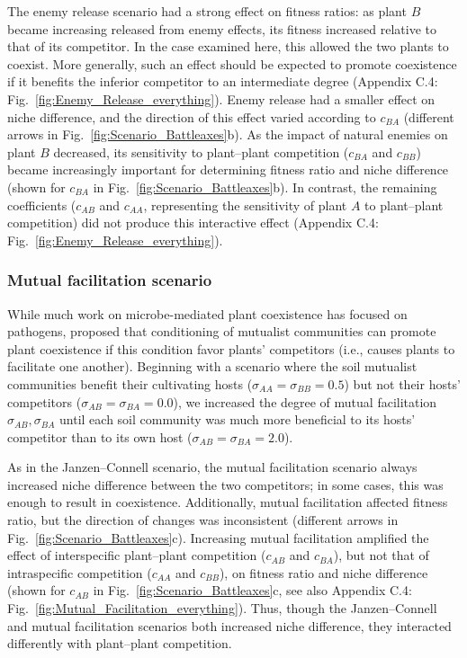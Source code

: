 The enemy release scenario had a strong effect on fitness ratios: as plant $B$ became increasing released from enemy effects, its fitness increased relative to that of its competitor. In the case examined here, this allowed the two plants to coexist. More generally, such an effect should be expected to promote coexistence if it benefits the inferior competitor to an intermediate degree (Appendix C.4: Fig.~\ref{fig:Enemy_Release_everything}). Enemy release had a smaller effect on niche difference, and the direction of this effect varied according to $c_{BA}$ (different arrows in Fig.~\ref{fig:Scenario_Battleaxes}b). As the impact of natural enemies on plant $B$ decreased, its sensitivity to plant--plant competition ($c_{BA}$ and $c_{BB}$) became increasingly important for determining fitness ratio and niche difference (shown for $c_{BA}$ in Fig.~\ref{fig:Scenario_Battleaxes}b). In contrast, the remaining coefficients ($c_{AB}$ and $c_{AA}$, representing the sensitivity of plant $A$ to plant--plant competition) did not produce this interactive effect (Appendix C.4: Fig.~\ref{fig:Enemy_Release_everything}).
\par



\subsubsection*{Mutual facilitation scenario}
While much work on microbe-mediated plant coexistence has focused on pathogens, \citet{Bever2002} proposed that conditioning of mutualist communities can promote plant coexistence if this condition favor plants' competitors (i.e., causes plants to facilitate one another). Beginning with a scenario where the soil mutualist communities benefit their cultivating hosts ($\sigma_{AA} = \sigma_{BB} = 0.5$) but not their hosts' competitors ($\sigma_{AB} = \sigma_{BA} = 0.0$), we increased the degree of mutual facilitation $\sigma_{AB}, \sigma_{BA}$ until each soil community was much more beneficial to its hosts' competitor than to its own host ($\sigma_{AB} = \sigma_{BA} = 2.0$).
\par


As in the Janzen--Connell scenario, the mutual facilitation scenario always increased niche difference between the two competitors; in some cases, this was enough to result in coexistence. Additionally, mutual facilitation affected fitness ratio, but the direction of changes was inconsistent (different arrows in Fig.~\ref{fig:Scenario_Battleaxes}c).
Increasing mutual facilitation amplified the effect of interspecific plant--plant competition ($c_{AB}$ and $c_{BA}$), but not that of intraspecific competition ($c_{AA}$ and $c_{BB}$), on fitness ratio and niche difference (shown for $c_{AB}$ in Fig.~\ref{fig:Scenario_Battleaxes}c, see also Appendix C.4: Fig.~\ref{fig:Mutual_Facilitation_everything}). Thus, though the Janzen--Connell and mutual facilitation scenarios both increased niche difference, they interacted differently with plant--plant competition.
\par



